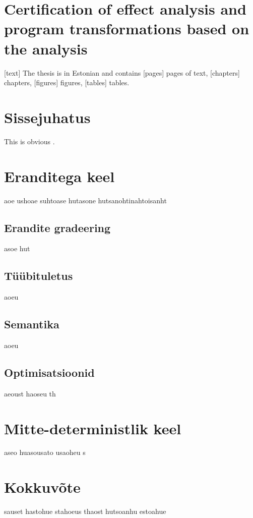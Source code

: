 \documentclass[a4paper,12pt]{article}
\begin{document}
\section*{Certification of effect analysis and program transformations based on the analysis}
[text]
The thesis is in Estonian and contains [pages] pages of text, [chapters] chapters, [figures] figures, [tables] tables.
\clearpage

\tableofcontents
\clearpage

\section{Sissejuhatus}

This is obvious \cite{Benton2016}.

\clearpage

\section{Eranditega keel}
aoe ushoae suhtoase hutasone hutsanohtinahtoisanht

\subsection{Erandite gradeering}
asoe hut

\subsection{Tüübituletus}
aoeu
\subsection{Semantika}
aoeu
\subsection{Optimisatsioonid}
aeoust haoseu th

\clearpage

\section{Mitte-deterministlik keel}
aseo huasousato usaoheu s

\section{Kokkuvõte}

sauset hastohue stahoeus thaost hutsoanhu estoahue


\printbibliography[title={Kasutatud kirjandus}]
\end{document}
